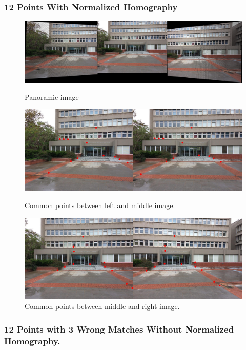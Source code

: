 \documentclass[letterpaper,12pt]{article}
\begin{document}
\subsubsection{12 Points With Normalized Homography}
\begin{figure}[!htb]
        \centering\includegraphics[width=1\columnwidth]{experiments/12points/norm/finalNonewrong.jpg}
          \caption{
                \label{} Panoramic image
        }
        \centering\includegraphics[width=1\columnwidth]{experiments/12points/norm/left-1_middleNonewrong.jpg}
          \caption{
                \label{} Common points between left and middle image.
        }
        \centering\includegraphics[width=1\columnwidth]{experiments/12points/norm/middle_left-1Nonewrong.jpg}
        \caption{
                \label{} Common points between middle and right image.
        }
\end{figure}

\FloatBarrier

\newpage
\subsubsection{12 Points with 3 Wrong Matches Without Normalized Homography.}
\end{document}
